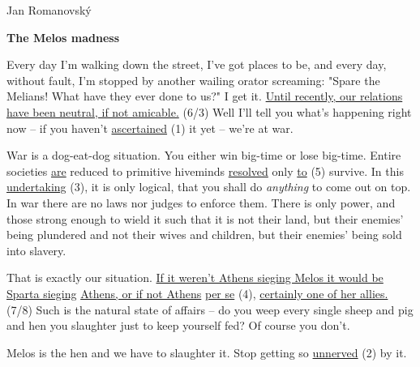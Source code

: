 \documentclass{article}
\begin{document}
\hfill Jan Romanovský
\begin{center}
    \textbf{The Melos madness}
\end{center}


Every day I'm walking down the street, I've got places to be, and every day, without fault, I'm stopped by another wailing orator screaming: "Spare the Melians! What have they ever done to us?" I get it. \underline{Until recently, our relations have been neutral, if not amicable.} (6/3) Well I'll tell you what's happening right now -- if you haven't \underline{ascertained} (1) it yet -- we're at war.

War is a dog-eat-dog situation. You either win big-time or lose big-time. Entire societies \underline{are} reduced to primitive hiveminds \underline{resolved} only \underline{to} (5) survive. In this \underline{undertaking} (3), it is only logical, that you shall do \textit{anything} to come out on top. In war there are no laws nor judges to enforce them. There is only power, and those strong enough to wield it such that it is not their land, but their enemies' being plundered and not their wives and children, but their enemies' being sold into slavery.

That is exactly our situation. \underline{If it weren't Athens sieging Melos it would be Sparta sieging} \underline{Athens, or if not Athens} \underline{per se} (4), \underline{certainly one of her allies.} (7/8) Such is the natural state of affairs -- do you weep every single sheep and pig and hen you slaughter just to keep yourself fed? Of course you don't.

Melos is the hen and we have to slaughter it. Stop getting so \underline{unnerved} (2) by it.
\end{document}
